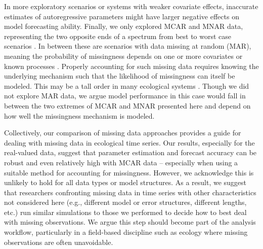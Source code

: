 \documentclass[12pt,english]{article} %
\begin{document}
\begin{linenumbers}
\begin{spacing}{1.9}
\begin{flushleft}
In more exploratory scenarios or systems with weaker covariate effects, inaccurate estimates of autoregressive parameters might have larger negative effects on model forecasting ability. Finally, we only explored MCAR and MNAR data, representing the two opposite ends of a spectrum from best to worst case scenarios \citep{newman_missing_2014}. In between these are scenarios with data missing at random (MAR), meaning the probability of missingness depends on one or more covariates or known processes \citep{newman_missing_2014}. Properly accounting for such missing data requires knowing the underlying mechanism such that the likelihood of missingness can itself be modeled. This may be a tall order in many ecological systems \citep[e.g.,][]{Sotto2011_mnar, McCall2014_mnar, Shoari2018_mnar}. Though we did not explore MAR data, we argue model performance in this case would fall in between the two extremes of MCAR and MNAR presented here and depend on how well the missingness mechanism is modeled. %

\hspace{1em}Collectively, our comparison of missing data approaches provides a guide for dealing with missing data in ecological time series. Our results, especially for the real-valued data, suggest that parameter estimation and forecast accuracy can be robust and even relatively high with MCAR data -- especially when using a suitable method for accounting for missingness. However, we acknowledge this is unlikely to hold for all data types or model structures. As a result, we suggest that researchers confronting missing data in time series with other characteristics not considered here (e.g., different model or error structures, different lengths, etc.) run similar simulations to those we performed to decide how to best deal with missing observations. We argue this step should become part of the analysis workflow, particularly in a field-based discipline such as ecology where missing observations are often unavoidable. %


\end{flushleft}
\end{spacing}
\end{linenumbers}
\end{document}
